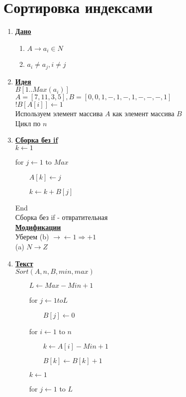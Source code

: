\documentclass[12pt]{report}
\begin{document}
	\section*{Сортировка индексами}
	\begin{enumerate}
		\item \textbf{\underline{Дано}}
		\begin{enumerate}
			\item $A \rightarrow a_i \in N$
			\item $a_i \neq a_j, i \neq j$
		\end{enumerate}
		\item \textbf{\underline{Идея}}\\
		$B[1..Max(a_i)]$\\
		$A=[7,11,3,5], B=[0,0,1,-,1,-,1,-,-,-,1]$\\
		$!B[A[i]]\leftarrow 1$\\
		Используем элемент массива $A$ как элемент массива $B$\\
		Цикл по $n$
		\item \textbf{\underline{Сборка без if}}\\
		$k \leftarrow 1$\par
		for $j \leftarrow 1$ to $Max$\par
		$\qquad A[k] \leftarrow j$\par
		$\qquad k \leftarrow k + B[j]$\par
		End\\
		Сборка без if - отвратительная\\
		\textbf{\underline{Модификации}}\\
		Уберем (b) $\rightarrow \leftarrow 1 \Rightarrow +1$\\
		(a) $N \rightarrow Z$
		\item \textbf{\underline{Текст}}\\
		$Sort(A, n, B, min, max)$\par
		$\qquad L \leftarrow Max-Min+1$\par
		$\qquad$for $j \leftarrow 1 to L$\par
		$\qquad\qquad B[j] \leftarrow 0$\par
		$\qquad$for $i \leftarrow 1$ to $n$\par
		$\qquad\qquad k \leftarrow A[i] - Min + 1$\par
		$\qquad\qquad B[k] \leftarrow B[k] + 1$\par
		$\qquad k \leftarrow 1$\par
		$\qquad$for $j \leftarrow 1$ to $L$\par

\end{enumerate}
\end{document}
